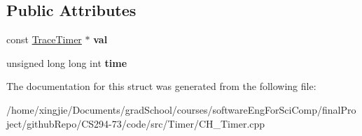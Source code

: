 \subsection*{Public Attributes}
\begin{DoxyCompactItemize}
\item 
\hypertarget{structelem_a70c81057f0b23f069da106d48887d445}{}const \hyperlink{classTraceTimer}{Trace\+Timer} $\ast$ {\bfseries val}\label{structelem_a70c81057f0b23f069da106d48887d445}

\item 
\hypertarget{structelem_abcb627f67401148616c650951b93b50e}{}unsigned long long int {\bfseries time}\label{structelem_abcb627f67401148616c650951b93b50e}

\end{DoxyCompactItemize}


The documentation for this struct was generated from the following file\+:\begin{DoxyCompactItemize}
\item 
/home/xingjie/\+Documents/grad\+School/courses/software\+Eng\+For\+Sci\+Comp/final\+Project/github\+Repo/\+C\+S294-\/73/code/src/\+Timer/C\+H\+\_\+\+Timer.\+cpp\end{DoxyCompactItemize}
